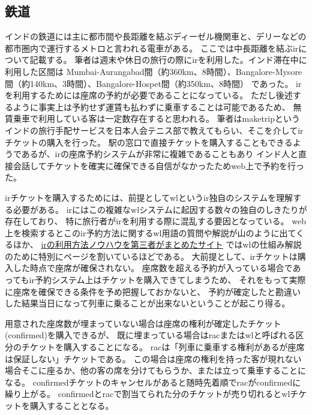 \subsection{鉄道}
インドの鉄道には主に都市間や長距離を結ぶディーゼル機関車と、デリーなどの都市圏内で運行するメトロと言われる電車がある。
ここでは中長距離を結ぶ\acrlong{ir}について記載する。
筆者は週末や休日の旅行の際に\acrlong{ir}を利用した。インド滞在中に利用した区間は
Mumbai-Aurangabad間（約360km、8時間）、Bangalore-Mysore間（約140km、3時間）、Bangalore-Hospet間（約350km、8時間）
であった。
\acrlong{ir}を利用するためには座席の予約が必要であることになっている。
ただし後述するように事実上は予約せず運賃も払わずに乗車することは可能であるため、
無賃乗車で利用している客は一定数存在すると思われる。
筆者は\acrshort{maketrip}というインドの旅行手配サービス\cite{maketrip}を日本人会テニス部で教えてもらい、そこを介して\acrlong{ir}チケットの購入を行った。
駅の窓口で直接チケットを購入することもできるようであるが、\acrlong{ir}の座席予約システムが非常に複雑であることもあり
インド人と直接会話してチケットを確実に確保できる自信がなかったためweb上で予約を行った。
\par
\acrlong{ir}チケットを購入するためには、前提として\acrshort{wl}という\acrlong{ir}独自のシステムを理解する必要がある。
\acrlong{ir}にはこの複雑な\acrshort{wl}システムに起因する数々の独自のしきたりが存在しており、
特に旅行者が\acrlong{ir}を利用する際に混乱する要因となっている。
web上を検索するとこの\acrlong{ir}予約方法に関する\acrshort{wl}用語の質問や解説が山のように出てくるほか、
\href{http://trainstuff.in/}{\acrlong{ir}の利用方法ノウハウを第三者がまとめたサイト} \cite{trainstuff}
では\acrshort{wl}の仕組み解説のために特別にページを割いているほどである。
大前提として、\acrlong{ir}チケットは購入した時点で座席が確保されない。
座席数を超える予約が入っている場合であっても\acrlong{ir}予約システム上はチケットを購入できてしまうため、
それをもって実際に座席を確保できる条件を予め把握しておかないと、
予約が確定したと勘違いした結果当日になって列車に乗ることが出来ないということが起こり得る。
\par
用意された座席数が埋まっていない場合は座席の権利が確定したチケット(confirmed)を購入できるが、
既に埋まっている場合は\gls{rac}または\acrshort{wl}と呼ばれる区分のチケットを購入することになる。
\acrshort{rac}は「列車に乗車する権利があるが座席は保証しない」チケットである。
この場合は座席の権利を持った客が現れない場合そこに座るか、他の客の席を分けてもらうか、または立って乗車することになる。
confirmedチケットのキャンセルがあると随時先着順で\acrshort{rac}がconfirmedに繰り上がる。
confirmedと\acrshort{rac}で割当てられた分のチケットが売り切れると\acrshort{wl}チケットを購入することとなる。
